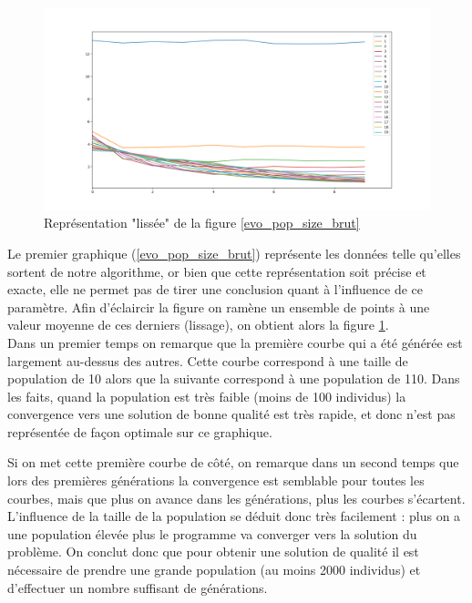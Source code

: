 \documentclass[12pt]{report}
\begin{document}
        \begin{figure}[!]
          \centering
          \includegraphics[width=18cm]{img/evo_pop_size_moy.png}
          \caption{Représentation "lissée" de la figure \ref{evo_pop_size_brut}}
          \label{evo_pop_size_moy}
        \end{figure}

        Le premier graphique (\ref{evo_pop_size_brut}) représente les données telle qu'elles sortent de notre algorithme, or bien que cette représentation soit précise et exacte, elle ne permet pas de tirer une conclusion quant à l'influence de ce paramètre. Afin d'éclaircir la figure on ramène un ensemble de points à une valeur moyenne de ces derniers (lissage), on obtient alors la figure \ref{evo_pop_size_moy}. \\

        Dans un premier temps on remarque que la première courbe qui a été générée est largement au-dessus des autres. Cette courbe correspond à une taille de population de 10 alors que la suivante correspond à une population de 110. Dans les faits, quand la population est très faible (moins de 100 individus) la convergence vers une solution de bonne qualité est très rapide, et donc n'est pas représentée de façon optimale sur ce graphique.

        Si on met cette première courbe de côté, on remarque dans un second temps que lors des premières générations la convergence est semblable pour toutes les courbes, mais que plus on avance dans les générations, plus les courbes s'écartent.
        \\ L'influence de la taille de la population se déduit donc très facilement : plus on a une population élevée plus le programme va converger vers la solution du problème. On conclut donc que pour obtenir une solution de qualité il est nécessaire de prendre une grande population (au moins 2000 individus) et d'effectuer un nombre suffisant de générations.
\end{document}
